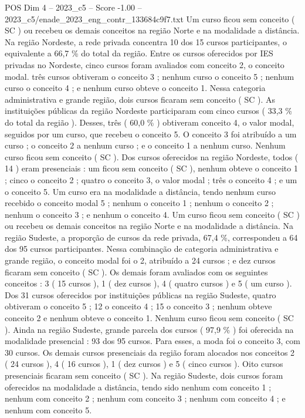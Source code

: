 \begin{textsample}{POS Dim 4 – 2023\_c5 – Score -1.00 – 2023\_c5/enade\_2023\_eng\_contr\_133684c9f7.txt}
Um curso ficou sem conceito ( SC ) ou recebeu os demais conceitos na região Norte e na modalidade a distância.
Na região Nordeste, a rede privada concentra 10 dos 15 cursos participantes, o equivalente a 66,7 \% do total da região.
Entre os cursos oferecidos por IES privadas no Nordeste, cinco cursos foram avaliados com conceito 2, o conceito modal. três cursos obtiveram o conceito 3 ; nenhum curso o conceito 5 ; nenhum curso o conceito 4 ; e nenhum curso obteve o conceito 1.
Nessa categoria administrativa e grande região, dois cursos ficaram sem conceito ( SC ).
As instituições públicas da região Nordeste participaram com cinco cursos ( 33,3 \% do total da região ).
Desses, três ( 60,0 \% ) obtiveram conceito 4, o valor modal, seguidos por um curso, que recebeu o conceito 5.
O conceito 3 foi atribuído a um curso ; o conceito 2 a nenhum curso ; e o conceito 1 a nenhum curso.
Nenhum curso ficou sem conceito ( SC ).
Dos cursos oferecidos na região Nordeste, todos ( 14 ) eram presenciais : um ficou sem conceito ( SC ), nenhum obteve o conceito 1 ; cinco o conceito 2 ; quatro o conceito 3, o valor modal ; três o conceito 4 ; e um o conceito 5.
Um curso era na modalidade a distância, tendo nenhum curso recebido o conceito modal 5 ; nenhum o conceito 1 ; nenhum o conceito 2 ; nenhum o conceito 3 ; e nenhum o conceito 4.
Um curso ficou sem conceito ( SC ) ou recebeu os demais conceitos na região Norte e na modalidade a distância.
Na região Sudeste, a proporção de cursos da rede privada, 67,4 \%, correspondeu a 64 dos 95 cursos participantes.
Nessa combinação de categoria administrativa e grande região, o conceito modal foi o 2, atribuído a 24 cursos ; e dez cursos ficaram sem conceito ( SC ).
Os demais foram avaliados com os seguintes conceitos : 3 ( 15 cursos ), 1 ( dez cursos ), 4 ( quatro cursos ) e 5 ( um curso ).
Dos 31 cursos oferecidos por instituições públicas na região Sudeste, quatro obtiveram o conceito 5 ; 12 o conceito 4 ; 15 o conceito 3 ; nenhum obteve conceito 2 e nenhum obteve o conceito 1.
Nenhum curso ficou sem conceito ( SC ).
Ainda na região Sudeste, grande parcela dos cursos ( 97,9 \% ) foi oferecida na modalidade presencial : 93 dos 95 cursos.
Para esses, a moda foi o conceito 3, com 30 cursos.
Os demais cursos presenciais da região foram alocados nos conceitos 2 ( 24 cursos ), 4 ( 16 cursos ), 1 ( dez cursos ) e 5 ( cinco cursos ).
Oito cursos presenciais ficaram sem conceito ( SC ).
Na região Sudeste, dois cursos foram oferecidos na modalidade a distância, tendo sido nenhum com conceito 1 ; nenhum com conceito 2 ; nenhum com conceito 3 ; nenhum com conceito 4 ; e nenhum com conceito 5.

\end{textsample}
